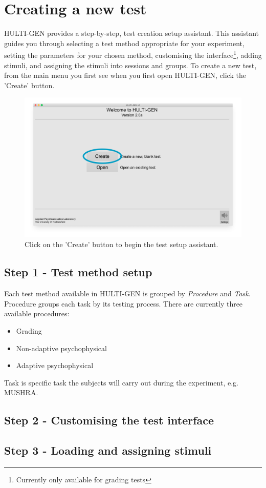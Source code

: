 \chapter{Creating a new test}
HULTI-GEN provides a step-by-step, test creation setup assistant. This assistant guides you through selecting a test method appropriate for your experiment, setting the parameters for your chosen method, customising the interface\footnote{Currently only available for grading tests}, adding stimuli, and assigning the stimuli into sessions and groups.
\newline\newline
To create a new test, from the main menu you first see when you first open HULTI-GEN, click the 'Create' button.

\begin{figure}[ht]
	\centering
	\includegraphics[width=1.0\textwidth]{./images/createTest_step01_mainScreen.jpg}
	\caption{Click on the 'Create' button to begin the test setup assistant.}
\end{figure}

\section{Step 1 - Test method setup}
Each test method available in HULTI-GEN is grouped by \emph{Procedure} and \emph{Task}. Procedure groups each task by its testing process. There are currently three available procedures:
\begin{itemize}
	\item Grading
	\item Non-adaptive psychophysical
	\item Adaptive psychophysical
\end{itemize}
 Task is specific task the subjects will carry out during the experiment, e.g. MUSHRA.

\section{Step 2 - Customising the test interface}

\section{Step 3 - Loading and assigning stimuli}